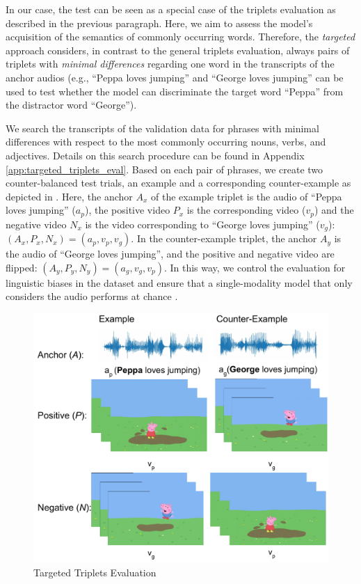 In our case, the test can be seen as a special case of the triplets evaluation as described in the previous paragraph. Here, we aim to assess the
model's acquisition of the semantics of commonly occurring
words. Therefore, the \textit{targeted} approach considers, in
contrast to the general triplets evaluation, always pairs of triplets
with \textit{minimal differences} regarding one word in the
transcripts of the anchor audios (e.g., ``Peppa loves jumping'' and
``George loves jumping'' can be used to test whether the model can
discriminate the target word ``Peppa'' from the distractor word
``George'').


We search the transcripts of the validation data for phrases with
minimal differences with respect to the most commonly occurring nouns, verbs, and adjectives. Details on
this search procedure can be found in Appendix
\ref{app:targeted_triplets_eval}. Based on each pair of phrases, we
create two counter-balanced test trials, an example and a
corresponding counter-example as depicted in
. Here, the anchor $A_x$ of the example
triplet is the audio of ``Peppa loves jumping'' ($a_p$), the positive
video $P_x$ is the corresponding video ($v_p$) and the negative video
$N_x$ is the video corresponding to ``George loves jumping'' ($v_g$):
$(A_x, P_x, N_x) = (a_p, v_p, v_g)$.  In the counter-example triplet,
the anchor $A_y$ is the audio of ``George loves jumping'', and the
positive and negative video are flipped:
$(A_y, P_y, N_y) = (a_g, v_g, v_p)$. In this way, we control the
evaluation for linguistic biases in the dataset and ensure that a
single-modality model that only considers the audio performs at chance
\citep[see also][]{nikolaus-fourtassi-2021-evaluating}.

\begin{figure}
  \centering
  \includegraphics[width=.7\linewidth]{peppa_targeted_triplets.pdf}
  \caption{Targeted Triplets Evaluation}
  \label{fig:targeted_triplets}
\end{figure}

